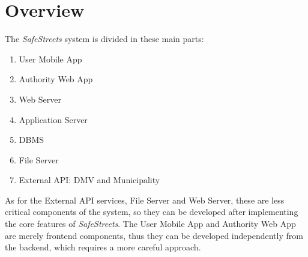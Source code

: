 \section{Overview}
The \emph{SafeStreets} system is divided in these main parts:
\begin{enumerate}
    \item User Mobile App
    \item Authority Web App
    \item Web Server
    \item Application Server
    \item DBMS
    \item File Server
    \item External API: DMV and Municipality
\end{enumerate}

As for the External API services, File Server and Web Server, these are less
critical components of the system, so they can be developed after implementing
the core features of \emph{SafeStreets}. The User Mobile App and Authority Web
App are merely frontend components, thus they can be developed independently
from the backend, which requires a more careful approach.